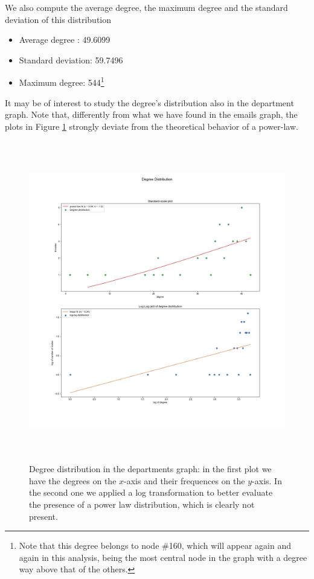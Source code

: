 \documentclass{report}
\theoremstyle{definition}
\theoremstyle{remark}
\begin{document}
We also compute the average degree, the maximum degree and the standard deviation of this distribution
\begin{itemize}
	\item Average degree : 49.6099
	\item Standard deviation: 59.7496
	\item Maximum degree: 544\footnote{Note that this degree belongs to node \#160, which will appear again and again in this analysis, being the most central node in the graph with a degree way above that of the others.}
\end{itemize}
It may be of interest to study the degree's distribution also in the department graph. Note that, differently from what we have found in the emails graph, the plots in Figure \ref{fig:DegDistDep} strongly deviate from the theoretical behavior of a power-law.
\begin{figure} [H]
	\centering
	\centerline{\includegraphics[width = 18cm, height = 14cm, keepaspectratio]{DEP_degree_distribution.png}}	\caption{Degree distribution in the departments graph: in the first plot we have the degrees on the $x$-axis and their frequences on the $y$-axis. In the second one we applied a log transformation to better evaluate the presence of a power law distribution, which is clearly not present.} \label{fig:DegDistDep}
\end{figure}
\newpage
\end{document}

